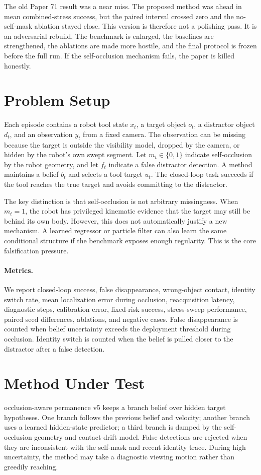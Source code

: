 \documentclass{article}
\newcommand{\vfive}{occlusion-aware permanence v5}
\begin{document}
The old Paper 71 result was a near miss.
The proposed method was ahead in mean combined-stress success, but the paired interval crossed zero and the no-self-mask ablation stayed close.
This version is therefore not a polishing pass.
It is an adversarial rebuild.
The benchmark is enlarged, the baselines are strengthened, the ablations are made more hostile, and the final protocol is frozen before the full run.
If the self-occlusion mechanism fails, the paper is killed honestly.

\section{Problem Setup}
Each episode contains a robot tool state $x_t$, a target object $o_t$, a distractor object $d_t$, and an observation $y_t$ from a fixed camera.
The observation can be missing because the target is outside the visibility model, dropped by the camera, or hidden by the robot's own swept segment.
Let $m_t \in \{0,1\}$ indicate self-occlusion by the robot geometry, and let $f_t$ indicate a false distractor detection.
A method maintains a belief $b_t$ and selects a tool target $u_t$.
The closed-loop task succeeds if the tool reaches the true target and avoids committing to the distractor.

The key distinction is that self-occlusion is not arbitrary missingness.
When $m_t=1$, the robot has privileged kinematic evidence that the target may still be behind its own body.
However, this does not automatically justify a new mechanism.
A learned regressor or particle filter can also learn the same conditional structure if the benchmark exposes enough regularity.
This is the core falsification pressure.

\paragraph{Metrics.}
We report closed-loop success, false disappearance, wrong-object contact, identity switch rate, mean localization error during occlusion, reacquisition latency, diagnostic steps, calibration error, fixed-risk success, stress-sweep performance, paired seed differences, ablations, and negative cases.
False disappearance is counted when belief uncertainty exceeds the deployment threshold during occlusion.
Identity switch is counted when the belief is pulled closer to the distractor after a false detection.

\section{Method Under Test}
\vfive{} keeps a branch belief over hidden target hypotheses.
One branch follows the previous belief and velocity; another branch uses a learned hidden-state predictor; a third branch is damped by the self-occlusion geometry and contact-drift model.
False detections are rejected when they are inconsistent with the self-mask and recent identity trace.
During high uncertainty, the method may take a diagnostic viewing motion rather than greedily reaching.
\end{document}
